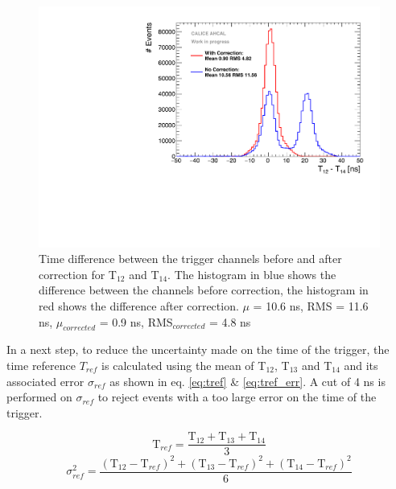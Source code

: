 \begin{figure}[t]
	\centering
	\includegraphics[width=1\textwidth]{chap5/fig_AHCAL_timing/T0s/T0_Resolution_5.pdf}
	\caption{Time difference between the trigger channels before and after correction for T$_{12}$ and T$_{14}$. The histogram in blue shows the difference between the channels before correction, the histogram in red shows the difference after correction. $\mu$ = 10.6 ns, RMS = 11.6 ns, $\mu_{corrected}$ = 0.9 ns, RMS$_{corrected}$ = 4.8 ns}
	\label{fig:T0_Correction}
\end{figure}

In a next step, to reduce the uncertainty made on the time of the trigger, the time reference $T_{ref}$ is calculated using the mean of T$_{12}$, T$_{13}$ and T$_{14}$ and its associated error $\sigma_{ref}$ as shown in eq. \ref{eq:tref} \& \ref{eq:tref_err}. A cut of 4 ns is performed on $\sigma_{ref}$ to reject events with a too large error on the time of the trigger.

\begin{equation} \label{eq:tref}
	\text{T}_{ref} = \frac{\text{T}_{12} + \text{T}_{13} + \text{T}_{14}}{3}
\end{equation}
\begin{equation} \label{eq:tref_err}
	\sigma_{ref}^2 = \frac{ (\text{T}_{12} - \text{T}_{ref})^2 + (\text{T}_{13} - \text{T}_{ref})^2  + (\text{T}_{14} - \text{T}_{ref})^2 }{6}
\end{equation}

